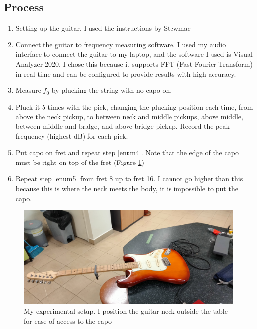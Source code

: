 \documentclass[11pt]{article}
\begin{document}
\begin{flushleft}
        \subsection{Process}
            \begin{enumerate}
                \item Setting up the guitar. I used the instructions by Stewmac %
                \item Connect the guitar to frequency measuring software. I used my audio interface to connect the guitar to my laptop, and the software I used is Visual Analyzer 2020. I chose this because it supports FFT (Fast Fourier Transform) in real-time and can be configured to provide results with high accuracy. 
                \item Measure $f_0$ by plucking the string with no capo on.
                \item Pluck it 5 times with the pick, changing the plucking position each time, from above the neck pickup, to between neck and middle pickups, above middle, between middle and bridge, and above bridge pickup. Record the peak frequency (highest dB) for each pick. \label{enum4}
                \item Put capo on  fret and repeat step \ref{enum4}. Note that the edge of the capo must be right on top of the fret (Figure \ref{fig5})\label{enum5}
                \item Repeat step \ref{enum5} from fret 8 up to fret 16. I cannot go higher than this because this is where the neck meets the body, it is impossible to put the capo.
            \end{enumerate}
            \begin{figure}[!h]
                \includegraphics[width = \textwidth]{ee/experiment_setup.jpg}
                \caption{My experimental setup. I position the guitar neck outside the table for ease of access to the capo} \label{fig5}
            \end{figure}

\end{flushleft}
\end{document}
